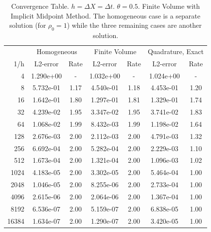 \documentclass{article}
\begin{document}
\begin{table}
\caption{Convergence Table. $h=\Delta X = \Delta t$. $\theta = 0.5$. Finite Volume with Implicit Midpoint Method. The homogeneous case is a separate solution (for $\rho_0 = 1$) while the three remaining cases are another solution.}
\label{tab:ct1}
\centering
\begin{tabular}{rcccccc}    
 & \multicolumn{2}{c}{Homogeneous} & \multicolumn{2}{c}{Finite Volume} & \multicolumn{2}{c}{Quadrature, Exact}\\
1/h & L2-error & Rate & L2-error & Rate & L2-error & Rate \\
4 	  & 1.290e+00 & -	 & 1.032e+00 & -    & 1.024e+00 & -     \\
8 	  & 5.732e-01 & 1.17 & 4.540e-01 & 1.18 & 4.453e-01 & 1.20  \\
16 	  & 1.642e-01 & 1.80 & 1.297e-01 & 1.81 & 1.329e-01 & 1.74  \\
32 	  & 4.239e-02 & 1.95 & 3.347e-02 & 1.95 & 3.741e-02 & 1.83  \\
64 	  & 1.068e-02 & 1.99 & 8.432e-03 & 1.99 & 1.198e-02 & 1.64  \\
128   & 2.676e-03 & 2.00 & 2.112e-03 & 2.00 & 4.791e-03 & 1.32  \\
256   & 6.692e-04 & 2.00 & 5.282e-04 & 2.00 & 2.229e-03 & 1.10  \\
512   & 1.673e-04 & 2.00 & 1.321e-04 & 2.00 & 1.096e-03 & 1.02  \\
1024  & 4.183e-05 & 2.00 & 3.302e-05 & 2.00 & 5.464e-04 & 1.00  \\
2048  & 1.046e-05 & 2.00 & 8.255e-06 & 2.00 & 2.733e-04 & 1.00  \\
4096  & 2.615e-06 & 2.00 & 2.064e-06 & 2.00 & 1.367e-04 & 1.00  \\
8192  & 6.536e-07 & 2.00 & 5.159e-07 & 2.00 & 6.838e-05 & 1.00  \\ 
16384 &	1.634e-07 & 2.00 & 1.290e-07 & 2.00 & 3.420e-05 & 1.00  \\
\end{tabular}
\end{table}
\end{document}
